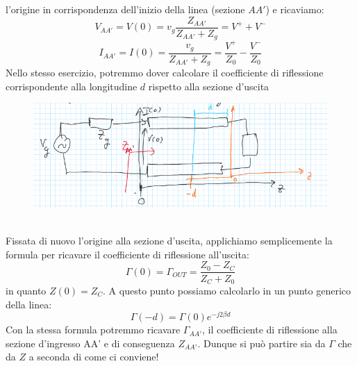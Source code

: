 \documentclass{book}
\begin{document}
        l'origine in corrispondenza dell'inizio della linea (sezione $AA'$) e ricaviamo:
        \begin{equation}
            V_{AA'}=V(0)=v_{g}\frac{Z_{AA'}}{Z_{AA'}+Z_{g}} = V^{+}+V^{-}  
        \end{equation}
        \begin{equation}
            I_{AA'}=I(0)=\frac{v_{g}}{Z_{AA'}+Z_{g}}=\frac{V^{+}}{Z_{0}}-\frac{V^{-}}{Z_{0}}
        \end{equation}
         Nello stesso esercizio, potremmo dover calcolare il coefficiente di riflessione 
        corrispondente alla longitudine $d$ rispetto alla sezione d'uscita
        \begin{figure}[h!]
            \center 
            \includegraphics[width=0.75\linewidth]{Chapter_two/Chapt2img9.png}
        \end{figure} \\
        Fissata di nuovo l'origine alla sezione d'uscita, applichiamo semplicemente la formula per 
        ricavare il coefficiente di riflessione all'uscita:
        \begin{equation}
            \Gamma(0) = \Gamma_{OUT} = \frac{Z_{0}-Z_{C}}{Z_{C}+Z_{0}}
        \end{equation}
        in quanto $Z(0)=Z_{C}$. A questo punto possiamo calcolarlo in un punto generico della linea:
        \begin{equation}
            \Gamma(-d) = \Gamma(0)e^{-j 2 \beta d}
        \end{equation}
        Con la stessa formula potremmo ricavare $\Gamma_{AA'}$, il coefficiente di riflessione alla sezione 
        d'ingresso AA' e di conseguenza $Z_{AA'}$. Dunque si può partire sia da $\Gamma$ che da $Z$ a seconda 
        di come ci conviene!
\end{document}
